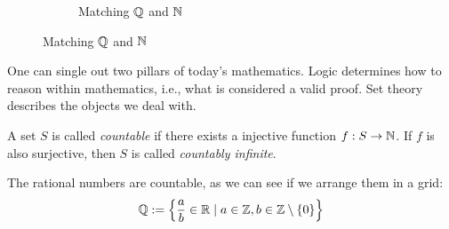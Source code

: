 \begin{figure}[ht]
\begin{subfigure}[t]{0.4\textwidth}
\caption*{Matching \(\mathbb{Q}\) and \(\mathbb{N}\)}
\end{subfigure}
\end{figure}
One can single out two pillars of today's mathematics.
Logic determines how to reason within mathematics, i.e., what is considered a valid proof.
Set theory describes the objects we deal with.

\begin{definition}\label{def:countable}
  A set \(S\) is called \emph{countable} if there exists a injective function \(f: S \to \mathbb{N}\).
  If \(f\) is also surjective, then \(S\) is called \emph{countably infinite}.
\end{definition}

The rational numbers are countable, as we can see if we arrange them in a grid:
\[
\mathbb{Q} := \left\{ \frac{a}{b} \in \mathbb{R} \mid a \in \mathbb{Z}, b \in \mathbb{Z} \setminus \{0\} \right\}
\]

